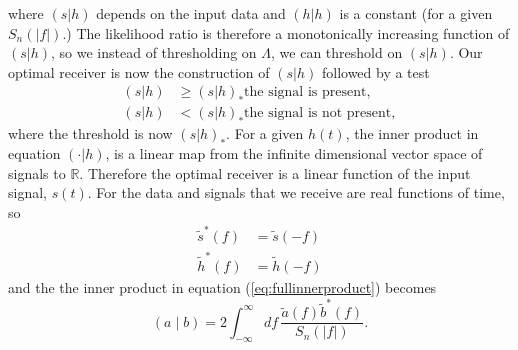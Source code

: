 where $(s|h)$ depends on the input data and $(h|h)$ is a constant (for a
given $S_n(|f|)$.) The likelihood ratio is therefore a monotonically
increasing function of $(s|h)$, so we instead of thresholding on $\Lambda$, we
can threshold on $(s|h)$. Our optimal receiver is now the construction of $(s|h)$
followed by a test
\begin{equation}
\begin{split}
(s|h) &\ge (s|h)_\ast \text{the signal is present}, \\
(s|h) &< (s|h)_\ast \text{the signal is not present},
\end{split}
\end{equation}
where the threshold is now $(s|h)_\ast$. For a given $h(t)$, the inner
product in equation $(\cdot|h)$, is a linear map from the infinite dimensional
vector space of signals to $\mathbb{R}$. Therefore the optimal receiver is a
linear function of the input signal, $s(t)$. For the data and signals that we
receive are real functions of time, so 
\begin{align}
\tilde{s}^\ast(f) &= \tilde{s}(-f) \\
\tilde{h}^\ast(f) &= \tilde{h}(-f)
\end{align}
and the the inner product in equation (\ref{eq:fullinnerproduct}) becomes
\begin{equation}
\left(a\mid b\right) = 2 \int_{-\infty}^{\infty}df\,
\frac{\tilde{a}(f)\tilde{b}^\ast(f)}{S_n\left(\left|f\right|\right)}.
\label{eq:innerproduct}
\end{equation}


